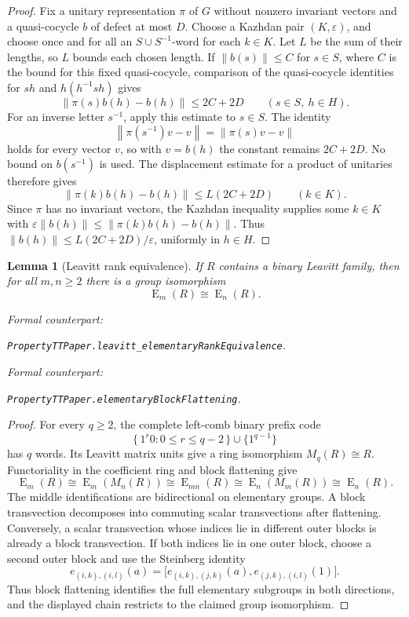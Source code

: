 \documentclass[11pt]{amsart}
\newif\ifanonymous\anonymoustrue
\newcommand{\leanrepo}{[repository link removed for anonymous review]}
\newcommand{\leanrepo}{https://github.com/SauersML/group-approximation}
\newcommand{\leanverified}[2]{%
  \par\smallskip\noindent
  {\normalfont\footnotesize\color{gray!70!black}%
  Formal counterpart:\par\nobreak\noindent
  \ifanonymous\nolinkurl{#2}\else
  \href{\leanrepo/blob/main/GroupApproximation/#1.lean}{\nolinkurl{#2}}\fi.}}
\newtheorem{lemma}[theorem]{Lemma}
\theoremstyle{definition}
\theoremstyle{plain}
\newcommand{\EL}{\operatorname{E}}
\newcommand{\norm}[1]{\left\lVert#1\right\rVert}
\begin{document}
\begin{proof}
Fix a unitary representation \(\pi\) of \(G\) without nonzero
invariant vectors and a quasi-cocycle \(b\) of defect at most \(D\).
Choose a Kazhdan pair \((K,\varepsilon)\), and choose once and for
all an \(S\cup S^{-1}\)-word for each \(k\in K\).  Let \(L\) be
the sum of their lengths, so \(L\) bounds each chosen length.  If
\(\norm{b(s)}\le C\) for \(s\in S\), where \(C\) is the bound for
this fixed quasi-cocycle,
comparison of the quasi-cocycle identities for \(sh\) and
\(h(h^{-1}sh)\) gives
\[
  \norm{\pi(s)b(h)-b(h)}\le 2C+2D
  \qquad(s\in S,\ h\in H).
\]
For an inverse letter \(s^{-1}\), apply this estimate to \(s\in S\).
The
identity
\[
  \norm{\pi(s^{-1})v-v}=\norm{\pi(s)v-v}
\]
holds for every vector \(v\), so with \(v=b(h)\) the constant remains
\(2C+2D\).  No bound on \(b(s^{-1})\) is used.
The displacement estimate for a product of unitaries therefore gives
\[
  \norm{\pi(k)b(h)-b(h)}
  \le L(2C+2D)\qquad(k\in K).
\]
Since \(\pi\) has no invariant vectors, the Kazhdan inequality
supplies some \(k\in K\) with
\(
  \varepsilon\norm{b(h)}
  \le\norm{\pi(k)b(h)-b(h)}.
\)
Thus \(\norm{b(h)}\le L(2C+2D)/\varepsilon\), uniformly in
\(h\in H\).
\end{proof}

\begin{lemma}[Leavitt rank equivalence]
\label{lem:rank-equivalence}
If \(R\) contains a binary Leavitt family, then for all
\(m,n\ge2\) there is a group isomorphism
\[
  \EL_m(R)\cong\EL_n(R).
\]
\leanverified{PropertyTT/PaperStatements}{PropertyTTPaper.leavitt_elementaryRankEquivalence}
\leanverified{PropertyTT/PaperStatements}{PropertyTTPaper.elementaryBlockFlattening}
\end{lemma}

\begin{proof}
For every \(q\ge2\), the complete left-comb binary prefix code
\[
 \{\,1^r0:0\le r\le q-2\,\}\cup\{1^{q-1}\}
\]
has \(q\) words.  Its Leavitt matrix units give a ring isomorphism
\(M_q(R)\cong R\).  Functoriality in the
coefficient ring and block flattening give
\[
 \EL_m(R)
 \cong \EL_m(M_n(R))
 \cong \EL_{mn}(R)
 \cong \EL_n(M_m(R))
 \cong \EL_n(R).
\]
The middle identifications are bidirectional on elementary groups.
A block transvection decomposes into commuting scalar
transvections after flattening.  Conversely, a scalar transvection
whose indices lie in different outer blocks is already a block
transvection.  If both indices lie in one outer block, choose a
second outer block and use the Steinberg identity
\[
 e_{(i,k),(i,l)}(a)
 =\bigl[e_{(i,k),(j,k)}(a),e_{(j,k),(i,l)}(1)\bigr].
\]
Thus block flattening identifies the full elementary subgroups in
both directions, and the displayed chain restricts to the claimed
group isomorphism.
\end{proof}
\end{document}
